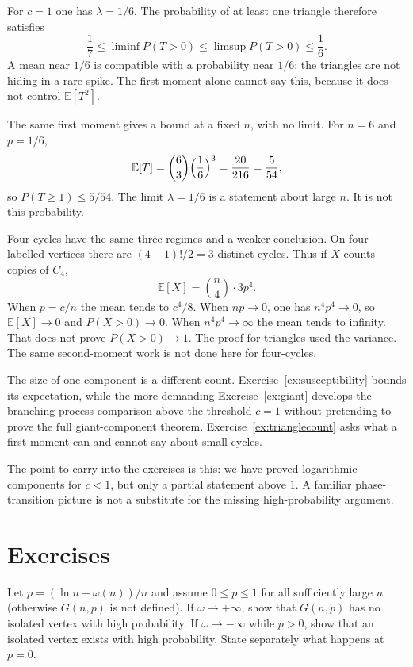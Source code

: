 For $c=1$ one has $\lambda=1/6$. The probability of at least one triangle therefore satisfies
\[
 \frac17\le\liminf P(T>0)\le\limsup P(T>0)\le\frac16.
\]
A mean near $1/6$ is compatible with a probability near $1/6$: the triangles are not hiding in a rare spike. The first moment alone cannot say this, because it does not control $\mathbb E[T^2]$.

The same first moment gives a bound at a fixed $n$, with no limit. For $n=6$ and $p=1/6$,
\[
 \mathbb E[T]=\binom63\Bigl(\frac16\Bigr)^3=\frac{20}{216}=\frac5{54},
\]
so $P(T\ge1)\le5/54$. The limit $\lambda=1/6$ is a statement about large $n$. It is not this probability.

Four-cycles have the same three regimes and a weaker conclusion. On four labelled vertices there are $(4-1)!/2=3$ distinct cycles. Thus if $X$ counts copies of $C_4$,
\[
 \mathbb E[X]=\binom n4\cdot 3p^4.
\]
When $p=c/n$ the mean tends to $c^4/8$. When $np\to0$, one has $n^4p^4\to0$, so $\mathbb E[X]\to0$ and $P(X>0)\to0$. When $n^4p^4\to\infty$ the mean tends to infinity. That does not prove $P(X>0)\to1$. The proof for triangles used the variance. The same second-moment work is not done here for four-cycles.

The size of one component is a different count. Exercise~\ref{ex:susceptibility} bounds its expectation, while the more demanding Exercise~\ref{ex:giant} develops the branching-process comparison above the threshold $c=1$ without pretending to prove the full giant-component theorem. Exercise~\ref{ex:trianglecount} asks what a first moment can and cannot say about small cycles.

The point to carry into the exercises is this: we have proved logarithmic components for $c<1$, but only a partial statement above $1$. A familiar phase-transition picture is not a substitute for the missing high-probability argument.

\section{Exercises}

\begin{exercise}[$\star\star$]\label{ex:connectivity}
Let $p=(\ln n+\omega(n))/n$ and assume $0\le p\le1$ for all sufficiently large $n$ (otherwise $G(n,p)$ is not defined). If $\omega\to+\infty$, show that $G(n,p)$ has no isolated vertex with high probability. If $\omega\to-\infty$ while $p>0$, show that an isolated vertex exists with high probability. State separately what happens at $p=0$.
\end{exercise}


